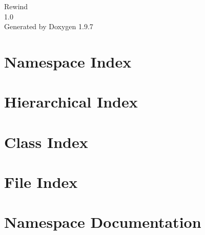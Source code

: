 \documentclass[twoside]{book}
\newcommand{\+}{\discretionary{\mbox{\scriptsize$\hookleftarrow$}}{}{}}
\newcommand{\clearemptydoublepage}{%
    \newpage{\pagestyle{empty}\cleardoublepage}%
  }
\begin{document}
  \raggedbottom
    \hypersetup{pageanchor=false,
                bookmarksnumbered=true,
                pdfencoding=unicode
               }
  \begin{titlepage}
  \vspace*{7cm}
  \begin{center}%
  {\Large Rewind}\\
  [1ex]\large 1.\+0 \\
  \vspace*{1cm}
  {\large Generated by Doxygen 1.9.7}\\
  \end{center}
  \end{titlepage}
  \clearemptydoublepage
  \tableofcontents
  \clearemptydoublepage
  \hypersetup{pageanchor=true}
\chapter{Namespace Index}

\chapter{Hierarchical Index}

\chapter{Class Index}

\chapter{File Index}

\chapter{Namespace Documentation}



\end{document}
